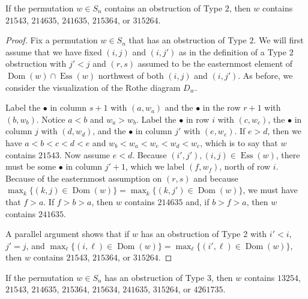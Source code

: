 \documentclass[ALCO,Unicode,published]{cedram}
\DeclareMathOperator{\Ess}{Ess}
\DeclareMathOperator{\Dom}{Dom}
\begin{document}
\begin{lemma}\label{lem:obstruction2}
If the permutation $w \in S_n$ contains an obstruction of Type $2$, then $w$ contains $21543$, $214635$, $241635$, $215364$, or $315264$.
\end{lemma}
\begin{proof}
Fix a permutation $w \in S_n$ that has an obstruction of Type $2$.  We will first assume that we have fixed $(i,j)$ and $(i,j')$ as in the definition of a Type $2$ obstruction with $j'<j$ and $(r,s)$ assumed to be the easternmost element of $\Dom(w) \cap \Ess(w)$ northwest of both $(i,j)$ and $(i,j')$.  As before, we consider the visualization of the Rothe diagram $D_w$.

Label the $\bullet$ in column $s+1$ with $(a,w_a)$ and the $\bullet$ in the row $r+1$ with $(b,w_b)$.  Notice $a<b$ and $w_a>w_b$.  Label the $\bullet$ in row $i$ with $(c,w_c)$, the $\bullet$ in column $j$ with $(d,w_d)$, and the $\bullet$ in column $j'$ with $(e,w_e)$.  If $e>d$, then we have $a<b<c<d<e$ and $w_b<w_a<w_e<w_d<w_c$, which is to say that $w$ contains $21543$.  Now assume $e<d$.  Because $(i',j'), (i,j) \in \Ess(w)$, there must be some $\bullet$ in column $j'+1$, which we label $(f,w_f)$, north of row $i$.  Because of the easternmost assumption on $(r,s)$ and because $\max_k \{(k,j) \in \Dom(w)\} = \max_k \{(k,j') \in \Dom(w)\}$, we must have that $f>a$.  If $f>b>a$, then $w$ contains $214635$ and, if $b>f>a$, then $w$ contains $241635$.  

A parallel argument shows that if $w$ has an obstruction of Type 2 with $i'<i$, $j' = j$, and $\max_\ell \{(i,\ell) \in \Dom(w)\} = \max_\ell \{(i',\ell) \in \Dom(w)\}$, then $w$ contains $21543$, $215364$, or $315264$.
\end{proof}

\begin{lemma}\label{lem:obstruction3}
If the permutation $w \in S_n$ has an obstruction of Type $3$, then $w$ contains $13254$, $21543$, $214635$, $215364$, $215634$, $241635$, $315264$, or $4261735$.  
\end{lemma}
\end{document}
